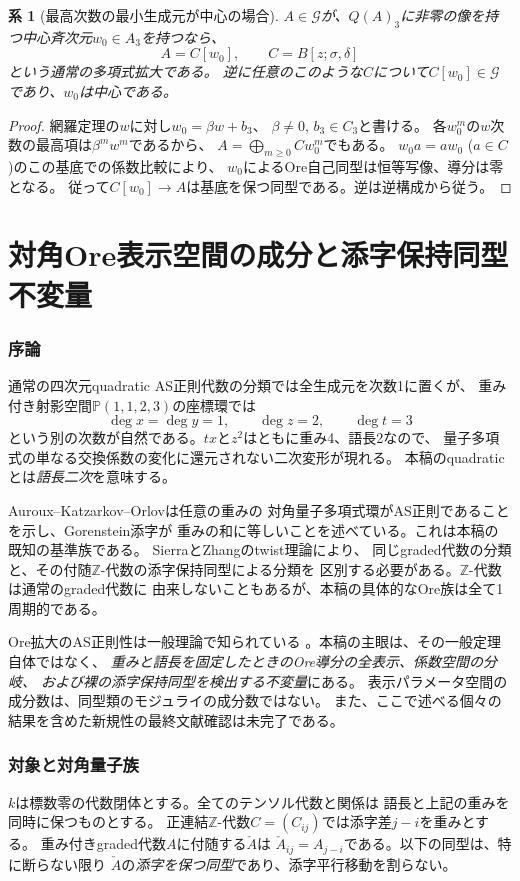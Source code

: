 \documentclass[11pt,a4paper]{ltjsarticle}
\newtheorem{corollary}[theorem]{系}
\theoremstyle{definition}
\newcommand{\Gclass}{\mathcal G}
\begin{document}
\begin{corollary}[最高次数の最小生成元が中心の場合]\label{spec:cor:central-generator}
$A\in\Gclass$が、$Q(A)_3$に非零の像を持つ中心斉次元$w_0\in A_3$を持つなら、
\[
A=C[w_0],\qquad C=B[z;\sigma,\delta]
\]
という通常の多項式拡大である。
逆に任意のこのような$C$について$C[w_0]\in\Gclass$であり、$w_0$は中心である。
\end{corollary}
\begin{proof}
網羅定理の$w$に対し$w_0=\beta w+b_3$、
$\beta\ne0$, $b_3\in C_3$と書ける。
各$w_0^m$の$w$次数の最高項は$\beta^m w^m$であるから、
$A=\bigoplus_{m\geq0}Cw_0^m$でもある。
$w_0a=aw_0$ ($a\in C$)のこの基底での係数比較により、
$w_0$によるOre自己同型は恒等写像、導分は零となる。
従って$C[w_0]\to A$は基底を保つ同型である。逆は逆構成から従う。
\end{proof}
\clearpage
\part{対角Ore表示空間の成分と添字保持同型不変量}
\section{序論}
通常の四次元quadratic AS正則代数の分類では全生成元を次数1に置くが、
重み付き射影空間$\mathbb P(1,1,2,3)$の座標環では
\[
\deg x=\deg y=1,\qquad\deg z=2,\qquad\deg t=3
\]
という別の次数が自然である。$tx$と$z^2$はともに重み4、語長2なので、
量子多項式の単なる交換係数の変化に還元されない二次変形が現れる。
本稿のquadraticとは\emph{語長二次}を意味する。

Auroux--Katzarkov--Orlov\cite[Proposition~2.6]{AKO}は任意の重みの
対角量子多項式環がAS正則であることを示し、Gorenstein添字が
重みの和に等しいことを述べている。これは本稿の既知の基準族である。
Sierra\cite[Theorem~1.2]{Sierra}とZhang\cite{Zhang}のtwist理論により、
同じgraded代数の分類と、その付随$\mathbb Z$-代数の添字保持同型による分類を
区別する必要がある。$\mathbb Z$-代数は通常のgraded代数に
由来しないこともあるが、本稿の具体的なOre族は全て1周期的である。

Ore拡大のAS正則性は一般理論で知られている
\cite[Theorem~3.3]{LWW}。本稿の主眼は、その一般定理自体ではなく、
\emph{重みと語長を固定したときのOre導分の全表示、係数空間の分岐、
および裸の添字保持同型を検出する不変量}にある。
表示パラメータ空間の成分数は、同型類のモジュライの成分数ではない。
また、ここで述べる個々の結果を含めた新規性の最終文献確認は未完了である。

\section{対象と対角量子族}
$k$は標数零の代数閉体とする。全てのテンソル代数と関係は
語長と上記の重みを同時に保つものとする。
正連結$\mathbb Z$-代数$C=(C_{ij})$では添字差$j-i$を重みとする。
重み付きgraded代数$A$に付随する$\check A$は
$\check A_{ij}=A_{j-i}$である。以下の同型は、特に断らない限り
$\check A$の\emph{添字を保つ同型}であり、添字平行移動を割らない。
\end{document}
